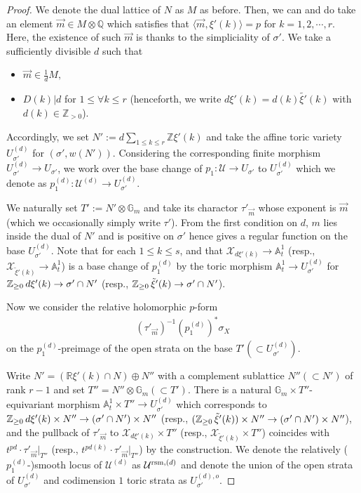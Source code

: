 \documentclass[12pt,a4paper]{amsart}
\theoremstyle{remark}
\theoremstyle{definition}
\def\R{\mathbb{R}}
\def\G{\mathbb{G}}
\def\Z{\mathbb{Z}}
\def\Q{\mathbb{Q}}
\def\A{\mathbb{A}}
\def\X{\mathcal{X}}
\begin{document}
\begin{proof}
 We denote the dual lattice of $N$ 
 as $M$ %
 as before. 
 Then, we can and do 
 take an element $\vec{m}\in M\otimes \Q$ which satisfies 
 that $\langle \vec{m}, \xi'(k)\rangle =p$ 
 for $k=1,2,\cdots,r$. 
 Here, the existence of such $\vec{m}$ is thanks to the simpliciality of 
 $\sigma'$. 
 We take 
 a sufficiently divisible 
 $d$ such that 
 \begin{itemize}
 \item $\vec{m}\in \frac{1}{d}M,$ 
 \item $D(k)|d$ for $1\le \forall k\le r$ 
 (henceforth, we write $d\xi'(k)=d(k)\tilde{\xi'}(k)$ with 
 $d(k)\in \Z_{>0}$). 
 \end{itemize}
 Accordingly, we set $N':=d\underset{1\le k\le r}\sum\Z\xi'(k)$ and 
 take the affine toric variety $U_{\sigma'}^{(d)}$ for 
 $(\sigma',w(N'))$. Considering the corresponding finite 
 morphism $U_{\sigma'}^{(d)}\to U_{\sigma'}$, we work over 
 the base change of $p_1\colon \mathcal{U}\to U_{\sigma'}$ to $U_{\sigma'}^{(d)}$ which we denote as 
 $p_1^{(d)}\colon \mathcal{U}^{(d)}\to U_{\sigma'}^{(d)}$. 

We naturally set $T':=N'\otimes \G_m$ and 
 take its charactor $\tau'_{\vec{m}}$ whose exponent is $\vec{m}$ 
 (which we occasionally simply write $\tau'$). 
 From the first condition on $d$, $m$ lies inside the 
 dual of $N'$ and is positive on $\sigma'$ hence 
 gives a regular function on the base $U_{\sigma'}^{(d)}$. 
 Note that for each $1\le k\le s$, 
 and that $\X_{d\xi'(k)} \to \A^1_t$ 
 (resp., $\X_{\tilde{\xi}'(k)} \to \A^1_t$) 
 is a base change of $p_1^{(d)}$ by the toric morphism 
 $\A_t^1\to U_{\sigma'}^{(d)}$ for 
 $\Z_{\ge 0}\hspace{0.6mm} d\xi'(k)\to \sigma'\cap N'$ (resp., $\Z_{\ge 0}\hspace{0.6mm} \tilde{\xi}'(k)\to \sigma'\cap N'$). 

Now we consider the relative holomorphic 
 $p$-form 
 \begin{align}\label{original.form}
 (\tau'_{\vec{m}})^{-1}(p_1^{(d)})^*\sigma_X
 \end{align} on the $p_1^{(d)}$-preimage of the open strata on  the base 
 $T'(\subset U_{\sigma'}^{(d)})$. 

Write $N'=(\R \xi'(k)\cap N)\oplus N''$ 
with a complement sublattice $N''(\subset N')$ of rank $r-1$ 
and set $T''=N''\otimes \G_m (\subset T')$. There is a natural 
$\G_m\times T''$-equivariant morphism 
$\A_t^1\times T''\to U_{\sigma'}^{(d)}$ 
which corresponds to 
 $\Z_{\ge 0}\hspace{0.6mm} d\xi'(k)\times N''\to (\sigma'\cap N')\times N''$ (resp., $(\Z_{\ge 0}\hspace{0.6mm} \tilde{\xi}'(k))\times N'' \to (\sigma'\cap N')\times N''$), 
and the pullback of $\tau'_{\vec{m}}$ to $\X_{d\xi'(k)}\times T''$ (resp., $\X_{\tilde{\xi}'(k)}\times T''$) coincides with $t^{pd}\cdot \tau'_{\vec{m}}|_{T''}$ (resp., $t^{pd(k)}\cdot \tau'_{\vec{m}}|_{T''}$) 
by the construction. 
We denote the relatively ($p_1^{(d)}$-)smooth locus of $\mathcal{U}^{(d)}$ as 
 $\mathcal{U}^{{\rm rsm}, (d)}$ and 
 denote the union of the open strata of $U_{\sigma'}^{(d)}$ 
 and codimension $1$ toric strata as $U_{\sigma'}^{(d),o}$. 


\end{proof}
\end{document}
